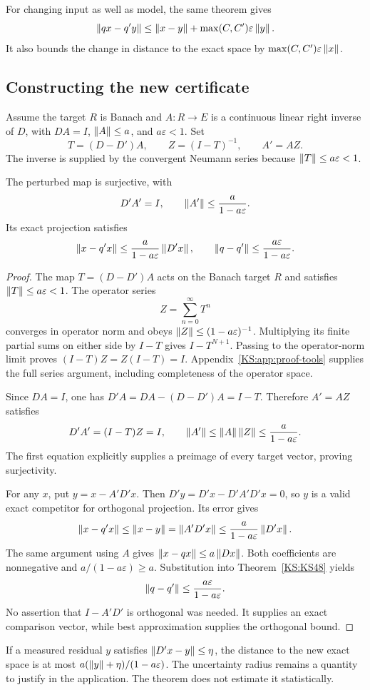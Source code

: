 For changing input as well as model, the same theorem gives
\[
 \left\lVert qx-q'y\right\rVert\le\left\lVert x-y\right\rVert+\max(C,C')\varepsilon\left\lVert y\right\rVert.
\]
It also bounds the change in distance to the exact space by \(\max(C,C')\varepsilon\left\lVert x\right\rVert\).

\subsection{Constructing the new certificate}
Assume the target \(R\) is Banach and \(A:R\to E\) is a continuous linear right inverse of \(D\), with \(DA=I\), \(\left\lVert A\right\rVert\le a\), and \(a\varepsilon<1\). Set
\[
 T=(D-D')A,\qquad Z=(I-T)^{-1},\qquad A'=AZ.
\]
The inverse is supplied by the convergent Neumann series because \(\left\lVert T\right\rVert\le a\varepsilon<1\).

\begin{KStheorem}\label{KS:KS49}
The perturbed map is surjective, with
\[
 D'A'=I,\qquad \left\lVert A'\right\rVert\le\frac{a}{1-a\varepsilon}.
\]
Its exact projection satisfies
\[
 \left\lVert x-q'x\right\rVert\le\frac{a}{1-a\varepsilon}\left\lVert D'x\right\rVert,\qquad
 \left\lVert q-q'\right\rVert\le\frac{a\varepsilon}{1-a\varepsilon}.
\]
\end{KStheorem}
\begin{proof}
The map $T=(D-D')A$ acts on the Banach target $R$ and satisfies $\left\lVert T\right\rVert\le a\varepsilon<1$. The operator series
\[
 Z=\sum_{n=0}^\infty T^n
\]
converges in operator norm and obeys $\left\lVert Z\right\rVert\le(1-a\varepsilon)^{-1}$. Multiplying its finite partial sums on either side by $I-T$ gives $I-T^{N+1}$. Passing to the operator-norm limit proves $(I-T)Z=Z(I-T)=I$. Appendix~\ref{KS:app:proof-tools} supplies the full series argument, including completeness of the operator space.

Since $DA=I$, one has $D'A=DA-(D-D')A=I-T$. Therefore $A'=AZ$ satisfies
\[
 D'A'=(I-T)Z=I,\qquad
 \left\lVert A'\right\rVert\le\left\lVert A\right\rVert\left\lVert Z\right\rVert\le\frac a{1-a\varepsilon}.
\]
The first equation explicitly supplies a preimage of every target vector, proving surjectivity.

For any $x$, put $y=x-A'D'x$. Then $D'y=D'x-D'A'D'x=0$, so $y$ is a valid exact competitor for orthogonal projection. Its error gives
\[
 \left\lVert x-q'x\right\rVert\le\left\lVert x-y\right\rVert=\left\lVert A'D'x\right\rVert
 \le\frac a{1-a\varepsilon}\left\lVert D'x\right\rVert.
\]
The same argument using $A$ gives $\left\lVert x-qx\right\rVert\le a\left\lVert Dx\right\rVert$. Both coefficients are nonnegative and $a/(1-a\varepsilon)\ge a$. Substitution into Theorem~\ref{KS:KS48} yields
\[
 \left\lVert q-q'\right\rVert\le\frac{a\varepsilon}{1-a\varepsilon}.
\]
No assertion that $I-A'D'$ is orthogonal was needed. It supplies an exact comparison vector, while best approximation supplies the orthogonal bound.
\end{proof}
If a measured residual \(y\) satisfies \(\left\lVert D'x-y\right\rVert\le\eta\), the distance to the new exact space is at most \(a(\left\lVert y\right\rVert+\eta)/(1-a\varepsilon)\). The uncertainty radius remains a quantity to justify in the application. The theorem does not estimate it statistically.

